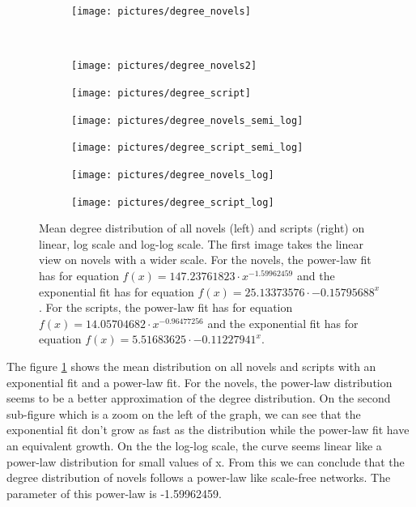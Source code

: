 \documentclass[a4paper, 12pt]{report}
\begin{document}
\begin{figure}
\begin{subfigure}{\textwidth}
\centering
\texttt{[image: pictures/degree\_novels]}
\end{subfigure}
\\
\begin{subfigure}{.45\textwidth}
\centering
\texttt{[image: pictures/degree\_novels2]}
\end{subfigure}
\hfill
\begin{subfigure}{.45\textwidth}
\centering
\texttt{[image: pictures/degree\_script]}
\end{subfigure}
\hfill
\begin{subfigure}{.45\textwidth}
\centering
\texttt{[image: pictures/degree\_novels\_semi\_log]}
\end{subfigure}
\hfill
\begin{subfigure}{.45\textwidth}
\centering
\texttt{[image: pictures/degree\_script\_semi\_log]}
\end{subfigure}
\hfill
\begin{subfigure}{.45\textwidth}
\centering
\texttt{[image: pictures/degree\_novels\_log]}
\end{subfigure}
\hfill
\begin{subfigure}{.45\textwidth}
\centering
\texttt{[image: pictures/degree\_script\_log]}
\end{subfigure}
\caption{Mean degree distribution of all novels (left) and scripts (right) on linear, log scale and log-log scale. The first image takes the linear view on novels with a wider scale. For the novels, the power-law fit has for equation $f(x) =  147.23761823  \cdot x^{-1.59962459}$ and the exponential fit has for equation $f(x) = 25.13373576 \cdot -0.15795688^x$.  For the scripts, the power-law fit has for equation $f(x) = 14.05704682 \cdot x^{-0.96477256}$ and the exponential fit has for equation $f(x) = 5.51683625 \cdot -0.11227941^x$.}
\label{cumulated_degree_novel}
\end{figure}


The figure \ref{cumulated_degree_novel} shows the mean distribution on all novels and scripts with an exponential fit and a power-law fit. For the novels, the  power-law distribution seems to be a better approximation of the degree distribution. On the second sub-figure which is a zoom on the left of the graph, we can see that the exponential fit don't grow as fast as the distribution while the  power-law fit have an equivalent growth. On the the log-log scale, the curve seems linear like a  power-law distribution for small values of x. From this we can conclude that the degree distribution of novels follows a power-law like scale-free networks. The parameter of this power-law is -1.59962459.\\
\end{document}

